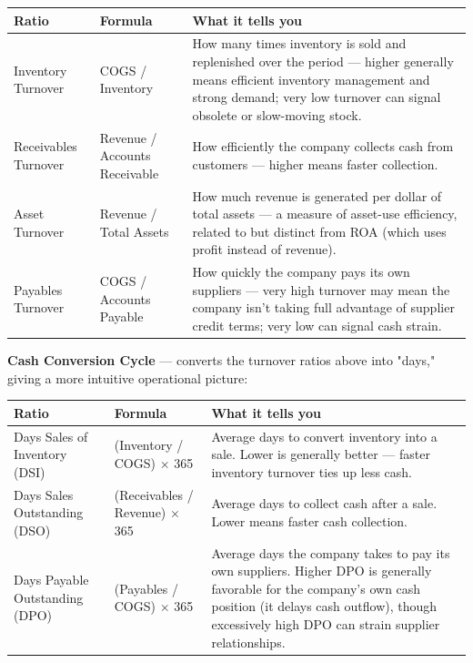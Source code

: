 \documentclass[12pt,openany]{book}
\begin{document}
\begingroup
\small
\setlength{\tabcolsep}{4pt}
\begin{center}\begin{tabular}{|L{0.22\textwidth}|L{0.24\textwidth}|L{0.42\textwidth}|}
\hline
\textbf{Ratio} & \textbf{Formula} & \textbf{What it tells you} \\
\hline
Inventory Turnover & COGS / Inventory & How many times inventory is sold and replenished over the period --- higher generally means efficient inventory management and strong demand; very low turnover can signal obsolete or slow-moving stock. \\
\hline
Receivables Turnover & Revenue / Accounts Receivable & How efficiently the company collects cash from customers --- higher means faster collection. \\
\hline
Asset Turnover & Revenue / Total Assets & How much revenue is generated per dollar of total assets --- a measure of asset-use efficiency, related to but distinct from ROA (which uses profit instead of revenue). \\
\hline
Payables Turnover & COGS / Accounts Payable & How quickly the company pays its own suppliers --- very high turnover may mean the company isn't taking full advantage of supplier credit terms; very low can signal cash strain. \\
\hline
\end{tabular}\end{center}
\endgroup

\textbf{Cash Conversion Cycle} --- converts the turnover ratios above into "days," giving a more intuitive operational picture:

\begingroup
\small
\setlength{\tabcolsep}{4pt}
\begin{center}\begin{tabular}{|L{0.22\textwidth}|L{0.24\textwidth}|L{0.42\textwidth}|}
\hline
\textbf{Ratio} & \textbf{Formula} & \textbf{What it tells you} \\
\hline
Days Sales of Inventory (DSI) & (Inventory / COGS) \(\times\) 365 & Average days to convert inventory into a sale. Lower is generally better --- faster inventory turnover ties up less cash. \\
\hline
Days Sales Outstanding (DSO) & (Receivables / Revenue) \(\times\) 365 & Average days to collect cash after a sale. Lower means faster cash collection. \\
\hline
Days Payable Outstanding (DPO) & (Payables / COGS) \(\times\) 365 & Average days the company takes to pay its own suppliers. Higher DPO is generally favorable for the company's own cash position (it delays cash outflow), though excessively high DPO can strain supplier relationships. \\
\hline
\end{tabular}\end{center}
\endgroup
\end{document}
